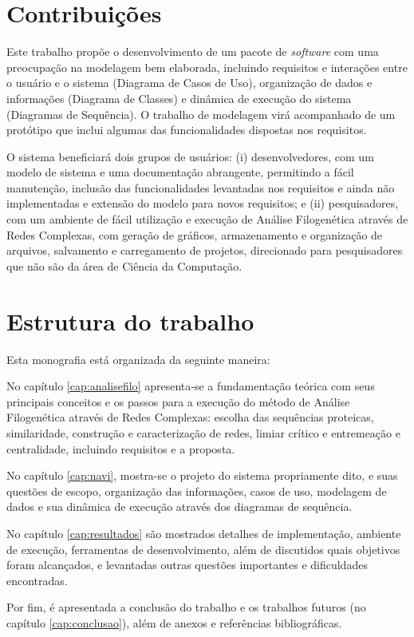\section{Contribuições}

Este trabalho propõe o desenvolvimento de um pacote de \textit{software} com uma preocupação na modelagem bem elaborada, incluindo requisitos e
interações entre o usuário
e o sistema (Diagrama de Casos de Uso), organização de dados e informações (Diagrama de Classes) e dinâmica de execução do sistema (Diagramas de Sequência).
O trabalho de modelagem virá acompanhado de um protótipo que inclui algumas das funcionalidades dispostas nos requisitos.

O sistema beneficiará dois grupos de usuários: (i) desenvolvedores, com um modelo de sistema e uma documentação abrangente, permitindo a fácil
manutenção, inclusão das funcionalidades levantadas nos requisitos e ainda não implementadas e extensão do modelo para novos requisitos; e (ii) pesquisadores,
com um ambiente de fácil utilização e execução de Análise Filogenética através de Redes Complexas, com geração de gráficos, armazenamento e organização de
arquivos, salvamento e carregamento de projetos, direcionado para pesquisadores que não são da área de Ciência da Computação.

\section{Estrutura do trabalho}

Esta monografia está organizada da seguinte maneira:

No capítulo \ref{cap:analisefilo} apresenta-se a fundamentação teórica com seus principais conceitos
e os passos para a execução do método de Análise Filogenética através de Redes Complexas: escolha das sequências proteicas,
similaridade, construção e caracterização de redes, limiar crítico e entremeação e centralidade, incluindo requisitos e a proposta.

No capítulo \ref{cap:navi}, mostra-se o projeto do sistema propriamente dito, e suas questões
de escopo, organização das informações, casos de uso, modelagem de dados e sua dinâmica de execução através dos diagramas de sequência.

No capítulo \ref{cap:resultados} são mostrados detalhes de implementação, ambiente de execução, ferramentas de
desenvolvimento, além de discutidos quais objetivos foram alcançados, e levantadas outras questões importantes e dificuldades encontradas.

Por fim, é apresentada a conclusão do trabalho e os trabalhos futuros (no capítulo \ref{cap:conclusao}), além de anexos e referências bibliográficas.





